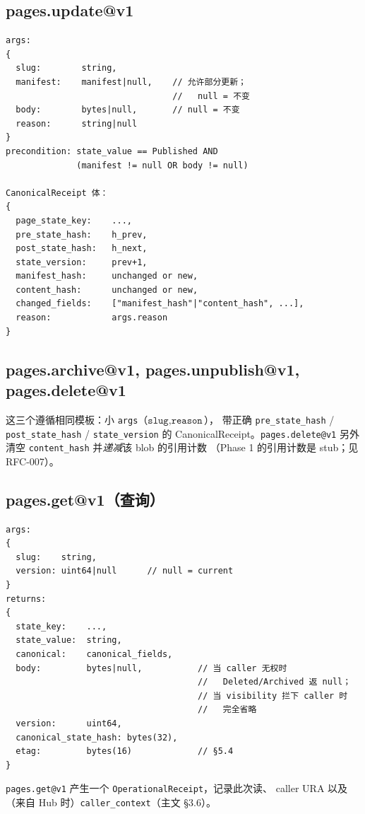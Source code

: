 \documentclass[11pt,a4paper]{article}
\theoremstyle{definition}
\begin{document}
\subsection{pages.update@v1}

\begin{lstlisting}
args:
{
  slug:        string,
  manifest:    manifest|null,    // 允许部分更新；
                                 //   null = 不变
  body:        bytes|null,       // null = 不变
  reason:      string|null
}
precondition: state_value == Published AND
              (manifest != null OR body != null)

CanonicalReceipt 体：
{
  page_state_key:    ...,
  pre_state_hash:    h_prev,
  post_state_hash:   h_next,
  state_version:     prev+1,
  manifest_hash:     unchanged or new,
  content_hash:      unchanged or new,
  changed_fields:    ["manifest_hash"|"content_hash", ...],
  reason:            args.reason
}
\end{lstlisting}

\subsection{pages.archive@v1, pages.unpublish@v1, pages.delete@v1}

这三个遵循相同模板：小 \texttt{args}（$\texttt{slug}, \texttt{reason}$），
带正确 \texttt{pre\_state\_hash} / \texttt{post\_state\_hash} /
\texttt{state\_version} 的 CanonicalReceipt。\texttt{pages.delete@v1}
另外清空 \texttt{content\_hash} 并\emph{递减}该 blob 的引用计数
（Phase 1 的引用计数是 stub；见 RFC-007）。

\subsection{pages.get@v1（查询）}

\begin{lstlisting}
args:
{
  slug:    string,
  version: uint64|null      // null = current
}
returns:
{
  state_key:    ...,
  state_value:  string,
  canonical:    canonical_fields,
  body:         bytes|null,           // 当 caller 无权时
                                      //   Deleted/Archived 返 null；
                                      // 当 visibility 拦下 caller 时
                                      //   完全省略
  version:      uint64,
  canonical_state_hash: bytes(32),
  etag:         bytes(16)             // §5.4
}
\end{lstlisting}

\texttt{pages.get@v1} 产生一个 \texttt{OperationalReceipt}，记录此次读、
caller URA 以及（来自 Hub 时）\texttt{caller\_context}（主文 \S3.6）。
\end{document}
